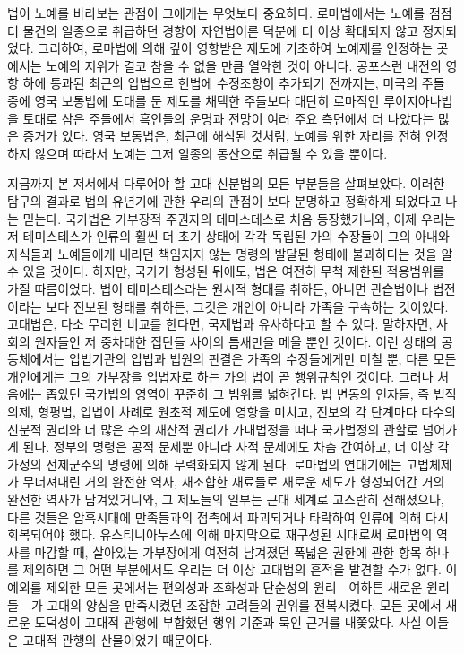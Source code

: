 법이 노예를 바라보는 관점이 그에게는 무엇보다 중요하다.
로마법에서는
노예를 점점 더 물건의 일종으로 취급하던 경향이
자연법이론 덕분에
더 이상 확대되지 않고 정지되었다.
그리하여,
로마법에 의해 깊이 영향받은 제도에 기초하여 노예제를 인정하는 곳에서는
노예의 지위가 결코 참을 수 없을 만큼 열악한 것이 아니다.
공포스런 내전의 영향 하에 통과된 최근의 입법으로
헌법에 수정조항이 추가되기 전까지는,
미국의 주들 중에
영국 보통법에 토대를 둔 제도를 채택한 주들보다
대단히 로마적인 루이지아나법을 토대로 삼은 주들에서
흑인들의 운명과 전망이 여러 주요 측면에서 더 나았다는
많은 증거가 있다.
영국 보통법은, 최근에 해석된 것처럼,
노예를 위한 자리를 전혀 인정하지 않으며
따라서 노예는 그저 일종의 동산으로 취급될 수 있을 뿐이다.

지금까지 본 저서에서 다루어야 할 고대 신분법의 모든 부분들을 살펴보았다.
이러한 탐구의 결과로
법의 유년기에 관한 우리의 관점이 보다 분명하고 정확하게 되었다고
나는 믿는다.
국가법은
가부장적 주권자의 테미스테스로
처음 등장했거니와,
이제 우리는
저 테미스테스가
인류의 훨씬 더 초기 상태에
각각 독립된 가의 수장들이 그의 아내와 자식들과 노예들에게 내리던
책임지지 않는 명령의
발달된 형태에 불과하다는 것을
알 수 있을 것이다.
하지만, 국가가 형성된 뒤에도,
법은 여전히 무척 제한된 적용범위를 가질 따름이었다.
법이 테미스테스라는 원시적 형태를 취하든,
아니면 관습법이나 법전이라는 보다 진보된 형태를 취하든,
그것은 개인이 아니라 가족을 구속하는 것이었다.
고대법은,
다소 무리한 비교를 한다면, 국제법과 유사하다고 할 수 있다.
말하자면, 사회의 원자들인 저 중차대한 집단들 사이의 틈새만을 메울 뿐인 것이다.
이런 상태의 공동체에서는
입법기관의 입법과 법원의 판결은
가족의 수장들에게만 미칠 뿐,
다른 모든 개인에게는
그의 가부장을 입법자로 하는
가의 법이 곧 행위규칙인 것이다.
그러나 처음에는 좁았던 국가법의 영역이 꾸준히 그 범위를 넓혀간다.
법 변동의 인자들, 즉
법적의제, 형평법, 입법이 차례로 원초적 제도에 영향을 미치고,
진보의 각 단계마다
다수의 신분적 권리와 더 많은 수의 재산적 권리가
가내법정을 떠나 국가법정의 관할로 넘어가게 된다.
정부의 명령은 공적 문제뿐 아니라 사적 문제에도 차츰 간여하고,
더 이상 각 가정의 전제군주의 명령에 의해 무력화되지 않게 된다.
로마법의 연대기에는
고법체제가 무너져내린 거의 완전한 역사,
재조합한 재료들로 새로운 제도가 형성되어간
거의 완전한 역사가 담겨있거니와,
그 제도들의 일부는 근대 세계로 고스란히 전해졌으나,
다른 것들은 암흑시대에 만족들과의 접촉에서 파괴되거나 타락하여
인류에 의해 다시 회복되어야 했다.
유스티니아누스에 의해 마지막으로 재구성된 시대로써
로마법의 역사를 마감할 때,
살아있는 가부장에게 여전히 남겨졌던 폭넓은 권한에 관한 항목 하나를 제외하면
그 어떤 부분에서도 우리는 더 이상 고대법의 흔적을 발견할 수가 없다.
이 예외를 제외한 모든 곳에서는
편의성과 조화성과 단순성의 원리---여하튼 새로운 원리들---가
고대의 양심을 만족시켰던 조잡한 고려들의 권위를 전복시켰다.
모든 곳에서
새로운 도덕성이 고대적 관행에 부합했던 행위 기준과 묵인 근거를
내쫓았다. 사실 이들은 고대적 관행의 산물이었기 때문이다.

